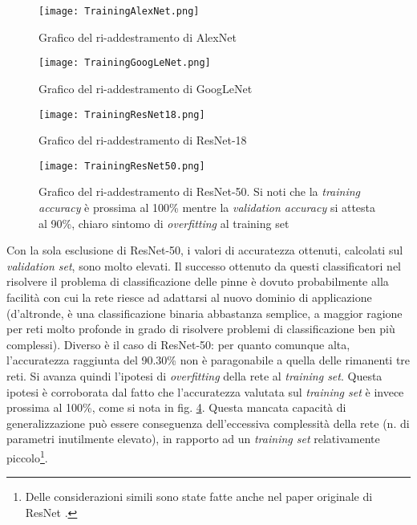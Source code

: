 \begin{figure}[h!]
  \centering
  \texttt{[image: TrainingAlexNet.png]}
  
  \caption{Grafico del ri-addestramento di AlexNet}
  \label{graficoAlexnet}

\end{figure}

\begin{figure}[h!]
  \centering
  \texttt{[image: TrainingGoogLeNet.png]}
  
  \caption{Grafico del ri-addestramento di GoogLeNet}
  \label{graficoGooglenet}

\end{figure}

\begin{figure}[h!]
  \centering
  \texttt{[image: TrainingResNet18.png]}
  
  \caption{Grafico del ri-addestramento di ResNet-18}
  \label{graficoResnet18}

\end{figure}

\begin{figure}[h!]
  \centering
  \texttt{[image: TrainingResNet50.png]}
  
  \caption{Grafico del ri-addestramento di ResNet-50.  Si noti che la \textit{training accuracy} è prossima al 100\% mentre la \textit{validation accuracy} si attesta al 90\%, chiaro sintomo di \textit{overfitting} al training set}
  \label{graficoResnet50}

\end{figure}

Con la sola esclusione di ResNet-50, i valori di accuratezza ottenuti, calcolati sul \textit{validation set}, sono molto elevati. Il successo ottenuto da questi classificatori nel risolvere il problema di classificazione delle pinne è dovuto probabilmente alla facilità con cui la rete riesce ad adattarsi al nuovo dominio di applicazione (d'altronde, è una classificazione binaria abbastanza semplice, a maggior ragione per reti molto profonde in grado di risolvere problemi di classificazione ben più complessi). Diverso è il caso di ResNet-50: per quanto comunque alta, l'accuratezza raggiunta del 90.30\% non è paragonabile a quella delle rimanenti tre reti. Si avanza quindi l'ipotesi di \textit{overfitting} della rete al \textit{training set}. Questa ipotesi è corroborata dal fatto che l'accuratezza valutata sul \textit{training set} è invece prossima al 100\%, come si nota in fig. \ref{graficoResnet50}. Questa mancata capacità di generalizzazione può essere conseguenza dell'eccessiva complessità della rete (n. di parametri inutilmente elevato), in rapporto ad un \textit{training set} relativamente piccolo\footnote{Delle considerazioni simili sono state fatte anche nel paper originale di ResNet \cite{resnet}.}.\\

